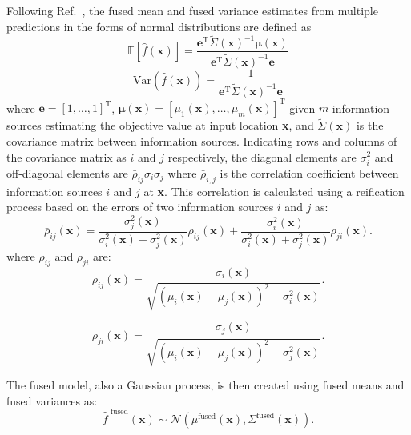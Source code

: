 Following Ref.~\cite{Winkler_1981}, the fused mean and fused variance estimates from multiple predictions in the forms of normal distributions are defined as
\begin{equation}
\label{e:WinklerMeanGen}
\mathbb{E} [\hat{f}(\mathbf{x})]=\frac{\mathbf{e}^\textrm{T} \tilde{\Sigma}(\mathbf{x})^{-1}  \boldsymbol{\mu}(\mathbf{x})}{\mathbf{e}^\textrm{T} \tilde{\Sigma}(\mathbf{x})^{-1} \mathbf{e}}
\end{equation}
\begin{equation}
\label{e:WinklerVarianceGen}
\textrm{Var}\left(\hat{f}(\mathbf{x})\right) = \frac{1}{\mathbf{e}^\textrm{T} \tilde{\Sigma}(\mathbf{x})^{-1} \mathbf{e}}
\end{equation} 
where $\mathbf{e} = [1,\ldots,1]^\textrm{T}$, $\boldsymbol{\mu}(\mathbf{x}) = [\mu_1(\mathbf{x}),\ldots,\mu_m(\mathbf{x})]^\textrm{T}$ given $m$ information sources estimating the objective value at input location \textbf{x}, and $\tilde{\Sigma}(\mathbf{x})$ is the covariance matrix between information sources. Indicating rows and columns of the covariance matrix as $i$ and $j$ respectively, the diagonal elements are $\sigma_i^2$ and off-diagonal elements are $\bar{\rho}_{ij} \sigma_i \sigma_j$ where $\bar{\rho}_{i,j}$ is the correlation coefficient between information sources $i$ and $j$ at \textbf{x}. This correlation is calculated using a reification process based on the errors of two information sources $i$ and $j$ as:
\begin{equation}
\bar{\rho}_{ij}(\mathbf{x}) = \frac{\sigma_j^2(\mathbf{x})}{\sigma_i^2(\mathbf{x}) + \sigma_j^2(\mathbf{x})} \rho_{ij}(\mathbf{x}) + \frac{\sigma_i^2(\mathbf{x})}{\sigma_i^2(\mathbf{x})+\sigma_j^2(\mathbf{x})} \rho_{ji}(\mathbf{x}).
\label{e:VWrho}
\end{equation}
where $\rho_{ij}$ and $\rho_{ji}$ are:
\begin{equation}
\rho_{ij}(\mathbf{x}) = \frac{\sigma_i(\mathbf{x})}{\sqrt{\left(\mu_i(\mathbf{x})-\mu_j(\mathbf{x})\right)^2 + \sigma_i^2(\mathbf{x})}}.
\label{e:rho1}
\end{equation}

\begin{equation}
\rho_{ji}(\mathbf{x}) = \frac{\sigma_j(\mathbf{x})}{\sqrt{\left(\mu_i(\mathbf{x})-\mu_j(\mathbf{x})\right)^2 + \sigma_j^2(\mathbf{x})}}.
\label{e:rho2}
\end{equation}

The fused model, also a Gaussian process, is then created using fused means and fused variances as:
\begin{equation}
    \hat {f}^{\textrm{~fused}} (\textbf{x}) \sim \mathcal{N}(\mu^{\textrm{fused}}(\textbf{x}),\Sigma^{\textrm{fused}}(\textbf{x})).
\end{equation}

